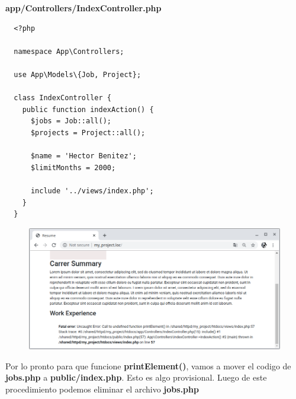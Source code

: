 \documentclass{article}
\begin{document}
\textbf{app/Controllers/IndexController.php}
\begin{verbatim}
  <?php

  namespace App\Controllers;

  use App\Models\{Job, Project};

  class IndexController {
    public function indexAction() {
      $jobs = Job::all();
      $projects = Project::all();

      $name = 'Hector Benitez';
      $limitMonths = 2000;

      include '../views/index.php';
    }
  }
\end{verbatim}

\begin{figure}[h!]
  \centering
  \includegraphics[scale=0.5]{./Pictures/130_printElemento_error.png}
\end{figure}

Por lo pronto para que funcione \textbf{printElement()}, vamos a mover el
codigo de \textbf{jobs.php} a \textbf{public/index.php}. Esto es algo
provisional. Luego de este procedimiento podemos eliminar el archivo
\textbf{jobs.php}\\
\end{document}
